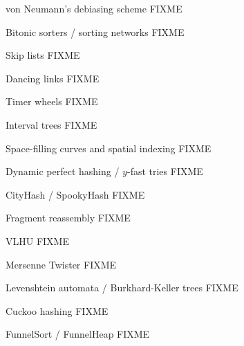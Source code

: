 \documentclass[mathserif,xcolor={dvipsnames,table}]{beamer}
\begin{document}
\begin{frame}{von Neumann's debiasing scheme}
\huge FIXME
\end{frame}

\begin{frame}{Bitonic sorters / sorting networks}
\huge FIXME
\end{frame}

\begin{frame}{Skip lists}
\huge FIXME
\end{frame}

\begin{frame}{Dancing links}
\huge FIXME
\end{frame}

\begin{frame}{Timer wheels}
\huge FIXME
\end{frame}

\begin{frame}{Interval trees}
\huge FIXME
\end{frame}

\begin{frame}{Space-filling curves and spatial indexing}
\huge FIXME
\end{frame}

\begin{frame}{Dynamic perfect hashing / $y$-fast tries}
\huge FIXME
\end{frame}

\begin{frame}{CityHash / SpookyHash}
\huge FIXME
\end{frame}

\begin{frame}{Fragment reassembly}
\huge FIXME
\end{frame}

\begin{frame}{VLHU}
\huge FIXME
\end{frame}

\begin{frame}{Mersenne Twister}
\huge FIXME
\end{frame}

\begin{frame}{Levenshtein automata / Burkhard-Keller trees}
\huge FIXME
\end{frame}

\begin{frame}{Cuckoo hashing}
\huge FIXME
\end{frame}

\begin{frame}{FunnelSort / FunnelHeap}
\huge FIXME
\end{frame}
\end{document}
